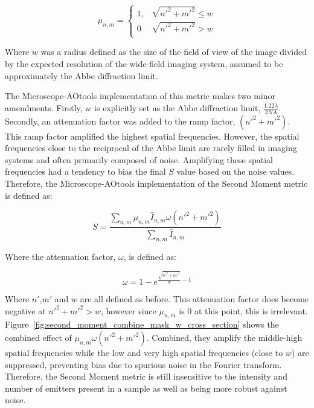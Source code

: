 \begin{equation}\label{eq:circular_mask}
\mu_{n,m} = 
\begin{cases}
1, & \sqrt{n'^{2} + m'^{2}} \le w\\
0 & \sqrt{n'^{2} + m'^{2}} > w\\ 
\end{cases}
\end{equation}

Where $w$ was a radius defined as the size of the field of view of the image divided by the expected resolution of the wide-field imaging system, assumed to be approximately the Abbe diffraction limit. 

The Microscope-AOtools implementation of this metric makes two minor amendments. Firstly, $w$ is explicitly set as the Abbe diffraction limit, $\frac{1.22 \lambda}{2 NA}$. Secondly, an attenuation factor was added to the ramp factor, $(n'^{2} + m'^{2})$. This ramp factor amplified the highest spatial frequencies. However, the spatial frequencies close to the reciprocal of the Abbe limit are rarely filled in imaging systems and often primarily composed of noise. Amplifying these spatial frequencies had a tendency to bias the final $S$ value based on the noise values. Therefore, the Microscope-AOtools implementation of the Second Moment metric is defined as:

\begin{equation}\label{eq:second_moment_metric}
S = \frac{\sum\limits_{n,m}{\mu_{n,m}\hat{I}_{n,m}\omega(n'^{2} + m'^{2})}}{\sum\limits_{n,m}{\hat{I}_{n,m}}}
\end{equation}

Where the attenuation factor, $\omega$, is defined as:

\begin{equation}\label{eq:attenuation_mask}
\omega = 1 - e^{\frac{\sqrt{n'^{2} + m'^{2}}}{w}-1}
\end{equation}

Where $n'$,$m'$ and $w$ are all defined as before. This attenuation factor does become negative at $n'^{2} + m'^{2} > w$, however since $\mu_{n,m}$ is $0$ at this point, this is irrelevant. Figure~\ref{fig:second_moment_combine_mask_w_cross_section} shows the combined effect of $\mu_{n,m}\omega(n'^{2} + m'^{2})$. Combined, they amplify the middle-high spatial frequencies while the low and very high spatial frequencies (close to $w$) are suppressed, preventing bias due to spurious noise in the Fourier transform. Therefore, the Second Moment metric is still insensitive to the intensity and number of emitters present in a sample as well as being more robust against noise.

